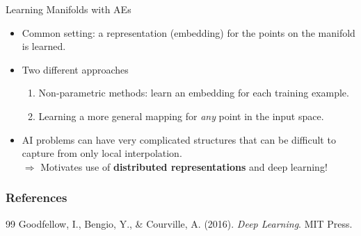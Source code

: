 \documentclass[11pt,compress,t,notes=noshow, xcolor=table]{beamer}
\begin{document}
\begin{vbframe}{Learning Manifolds with AEs}
    \begin{itemize}
        \item Common setting: a representation (embedding) for the points on the manifold is learned.
        \item Two different approaches
            \begin{enumerate}
                \item Non-parametric methods: learn an embedding for each training example.
                \item Learning a more general mapping for \textit{any} point in the input space.
            \end{enumerate}
        \item %
        AI problems can have very complicated structures that can be difficult to capture from only local interpolation.\\
            $\Rightarrow$ Motivates use of \textbf{distributed representations} and deep learning!
    \end{itemize}
\end{vbframe}

\begin{vbframe}
\frametitle{References}
\footnotesize{
\begin{thebibliography}{99}
Goodfellow, I., Bengio, Y., \& Courville, A. (2016). \textit{Deep Learning}. MIT Press.
\end{thebibliography}
}
\end{vbframe}



\endlecture
\end{document}
